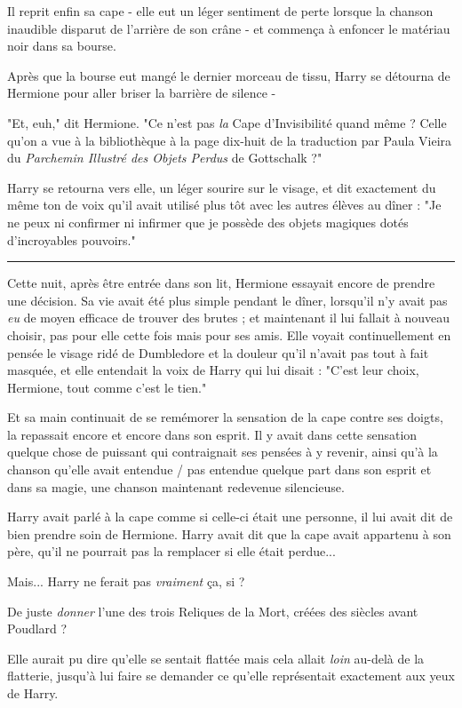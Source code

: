 Il reprit enfin sa cape - elle eut un léger sentiment de perte lorsque la chanson inaudible disparut de l'arrière de son crâne - et commença à enfoncer le matériau noir dans sa bourse.

Après que la bourse eut mangé le dernier morceau de tissu, Harry se détourna de Hermione pour aller briser la barrière de silence -

"Et, euh," dit Hermione. "Ce n'est pas \emph{la}  Cape d'Invisibilité quand même ? Celle qu'on a vue à la bibliothèque à la page dix-huit de la traduction par Paula Vieira du \emph{Parchemin Illustré des Objets Perdus}  de Gottschalk ?"

Harry se retourna vers elle, un léger sourire sur le visage, et dit exactement du même ton de voix qu'il avait utilisé plus tôt avec les autres élèves au dîner : "Je ne peux ni confirmer ni infirmer que je possède des objets magiques dotés d'incroyables pouvoirs."
\par\noindent\rule{\textwidth}{0.4pt}
Cette nuit, après être entrée dans son lit, Hermione essayait encore de prendre une décision. Sa vie avait été plus simple pendant le dîner, lorsqu'il n'y avait pas \emph{eu}  de moyen efficace de trouver des brutes ; et maintenant il lui fallait à nouveau choisir, pas pour elle cette fois mais pour ses amis. Elle voyait continuellement en pensée le visage ridé de Dumbledore et la douleur qu'il n'avait pas tout à fait masquée, et elle entendait la voix de Harry qui lui disait : "C'est leur choix, Hermione, tout comme c'est le tien."

Et sa main continuait de se remémorer la sensation de la cape contre ses doigts, la repassait encore et encore dans son esprit. Il y avait dans cette sensation quelque chose de puissant qui contraignait ses pensées à y revenir, ainsi qu'à la chanson qu'elle avait entendue / pas entendue quelque part dans son esprit et dans sa magie, une chanson maintenant redevenue silencieuse.

Harry avait parlé à la cape comme si celle-ci était une personne, il lui avait dit de bien prendre soin de Hermione. Harry avait dit que la cape avait appartenu à son père, qu'il ne pourrait pas la remplacer si elle était perdue...

Mais... Harry ne ferait pas \emph{vraiment}  ça, si ?

De juste \emph{donner}  l'une des trois Reliques de la Mort, créées des siècles avant Poudlard ?

Elle aurait pu dire qu'elle se sentait flattée mais cela allait \emph{loin}  au-delà de la flatterie, jusqu'à lui faire se demander ce qu'elle représentait exactement aux yeux de Harry.


